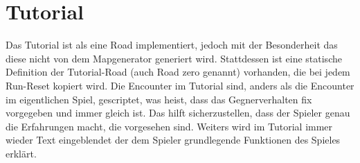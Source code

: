 
\section{Tutorial}\label{sec:tutorial}

\renewcommand{\kapitelautor}{Autor: Marvin Kurka}

Das Tutorial ist als eine Road implementiert, jedoch mit der Besonderheit das diese nicht von dem Mapgenerator generiert
wird.
Stattdessen ist eine statische Definition der Tutorial-Road (auch Road zero genannt) vorhanden, die bei jedem Run-Reset
kopiert wird.
Die Encounter im Tutorial sind, anders als die Encounter im eigentlichen Spiel, gescriptet, was heist, dass das
Gegnerverhalten fix vorgegeben und immer gleich ist.
Das hilft sicherzustellen, dass der Spieler genau die Erfahrungen macht, die vorgesehen sind.
Weiters wird im Tutorial immer wieder Text eingeblendet der dem Spieler grundlegende Funktionen des Spieles erklärt.

\renewcommand{\kapitelautor}{}
